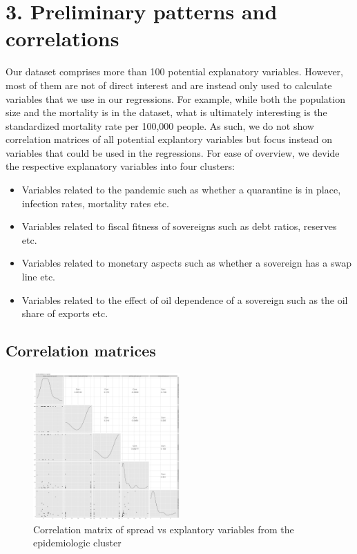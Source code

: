 \documentclass[11pt,]{article}
\providecommand{\tightlist}{%
\setlength{\itemsep}{0pt}\setlength{\parskip}{0pt}}
\begin{document}
\hypertarget{preliminary-patterns-and-correlations}{%
\section{3. Preliminary patterns and
correlations}\label{preliminary-patterns-and-correlations}}

Our dataset comprises more than 100 potential explanatory variables.
However, most of them are not of direct interest and are instead only
used to calculate variables that we use in our regressions. For example,
while both the population size and the mortality is in the dataset, what
is ultimately interesting is the standardized mortality rate per 100,000
people. As such, we do not show correlation matrices of all potential
explantory variables but focus instead on variables that could be used
in the regressions. For ease of overview, we devide the respective
explanatory variables into four clusters:

\begin{itemize}
\tightlist
\item
  Variables related to the pandemic such as whether a quarantine is in
  place, infection rates, mortality rates etc.
\item
  Variables related to fiscal fitness of sovereigns such as debt ratios,
  reserves etc.
\item
  Variables related to monetary aspects such as whether a sovereign has
  a swap line etc.
\item
  Variables related to the effect of oil dependence of a sovereign such
  as the oil share of exports etc.
\end{itemize}

\hypertarget{correlation-matrices}{%
\subsection{Correlation matrices}\label{correlation-matrices}}

\begin{figure}
\centering
\includegraphics[width=0.5\textwidth,height=\textheight]{reportfigures/Corrmatrix_spread_vs_covid.png}
\caption{Correlation matrix of spread vs explantory variables from the
epidemiologic cluster}
\end{figure}
\end{document}
